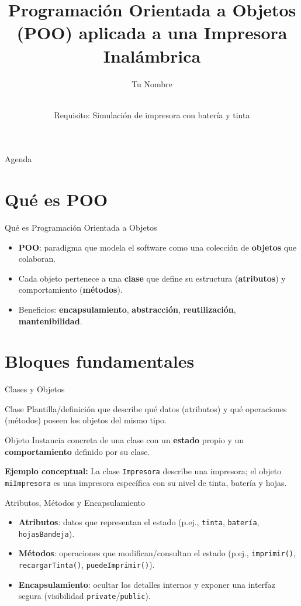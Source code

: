 \documentclass[aspectratio=169]{beamer}
\title[POO e Impresora Inalámbrica]{Programación Orientada a Objetos (POO) aplicada a una Impresora Inalámbrica}
\author{Tu Nombre}
\institute{COM200}
\date{\\\small Requisito: Simulación de impresora con batería y tinta}
\begin{document}
\begin{frame}
  \titlepage
\end{frame}

\begin{frame}{Agenda}
  \tableofcontents
\end{frame}

\section{Qué es POO}

\begin{frame}{Qué es Programación Orientada a Objetos}
  \begin{itemize}
    \item \textbf{POO}: paradigma que modela el software como una colección de \textbf{objetos} que colaboran.
    \item Cada objeto pertenece a una \textbf{clase} que define su estructura (\textbf{atributos}) y comportamiento (\textbf{métodos}).
    \item Beneficios: \textbf{encapsulamiento}, \textbf{abstracción}, \textbf{reutilización}, \textbf{mantenibilidad}.
  \end{itemize}
\end{frame}

\section{Bloques fundamentales}

\begin{frame}{Clases y Objetos}
  \begin{block}{Clase}
    Plantilla/definición que describe qué datos (atributos) y qué operaciones (métodos) poseen los objetos del mismo tipo.
  \end{block}
  \begin{block}{Objeto}
    Instancia concreta de una clase con un \textbf{estado} propio y un \textbf{comportamiento} definido por su clase.
  \end{block}
  \vspace{4pt}
  \textbf{Ejemplo conceptual:} La clase \texttt{Impresora} describe una impresora; el objeto \texttt{miImpresora} es una impresora específica con su nivel de tinta, batería y hojas.
\end{frame}

\begin{frame}{Atributos, Métodos y Encapsulamiento}
  \begin{itemize}
    \item \textbf{Atributos}: datos que representan el estado (p.ej., \texttt{tinta}, \texttt{batería}, \texttt{hojasBandeja}).
    \item \textbf{Métodos}: operaciones que modifican/consultan el estado (p.ej., \texttt{imprimir()}, \texttt{recargarTinta()}, \texttt{puedeImprimir()}).
    \item \textbf{Encapsulamiento}: ocultar los detalles internos y exponer una interfaz segura (visibilidad \texttt{private}/\texttt{public}).
  \end{itemize}
\end{frame}
\end{document}
